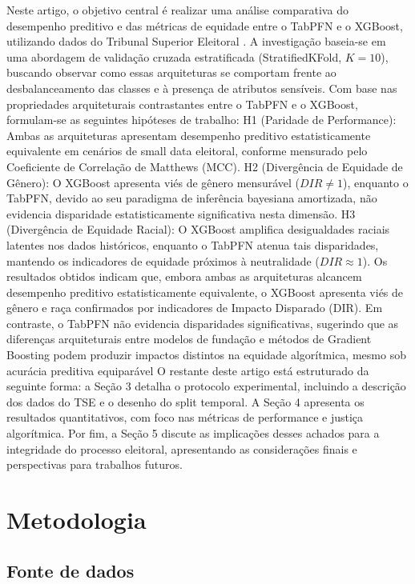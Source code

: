 \documentclass[12pt]{article}
\begin{document}
Neste artigo, o objetivo central é realizar uma análise comparativa do desempenho preditivo e das métricas
de equidade entre o TabPFN e o XGBoost, utilizando dados do Tribunal Superior
Eleitoral \cite{basedosdados:2026}. A investigação baseia-se em uma abordagem de validação cruzada estratificada
(StratifiedKFold, $K=10$), buscando observar como essas arquiteturas se comportam frente ao desbalanceamento
das classes e à presença de atributos sensíveis.  Com base nas propriedades arquiteturais contrastantes
entre o TabPFN e o XGBoost, formulam-se as seguintes hipóteses de trabalho: H1 (Paridade de Performance):
Ambas as arquiteturas apresentam desempenho preditivo estatisticamente equivalente em cenários de small
data eleitoral, conforme mensurado pelo Coeficiente de Correlação de Matthews (MCC). H2 (Divergência de
Equidade de Gênero): O XGBoost apresenta viés de gênero mensurável ($DIR \neq 1$), enquanto o TabPFN,
devido ao seu paradigma de inferência bayesiana amortizada, não evidencia disparidade estatisticamente
significativa nesta dimensão. H3 (Divergência de Equidade Racial): O XGBoost amplifica desigualdades
raciais latentes nos dados históricos, enquanto o TabPFN atenua tais disparidades, mantendo os indicadores
de equidade próximos à neutralidade ($DIR \approx 1$). Os resultados obtidos indicam que, embora ambas as
arquiteturas alcancem desempenho preditivo estatisticamente equivalente, o XGBoost apresenta viés de
gênero e raça confirmados por indicadores de Impacto Disparado (DIR). Em contraste, o TabPFN não evidencia
disparidades significativas, sugerindo que as diferenças arquiteturais entre modelos de fundação e métodos
de Gradient Boosting podem produzir impactos distintos na equidade algorítmica, mesmo sob acurácia preditiva
equiparável O restante deste artigo está estruturado da seguinte forma: a Seção 3 detalha o protocolo
experimental, incluindo a descrição dos dados do TSE e o desenho do split temporal. A Seção 4 apresenta
os resultados quantitativos, com foco nas métricas de performance e justiça algorítmica. Por fim, a Seção
5  discute as implicações desses achados para a integridade do processo eleitoral, apresentando as
considerações finais e perspectivas para trabalhos futuros.

\section{Metodologia} \label{sec:metodologia}

\subsection{Fonte de dados}
\end{document}
